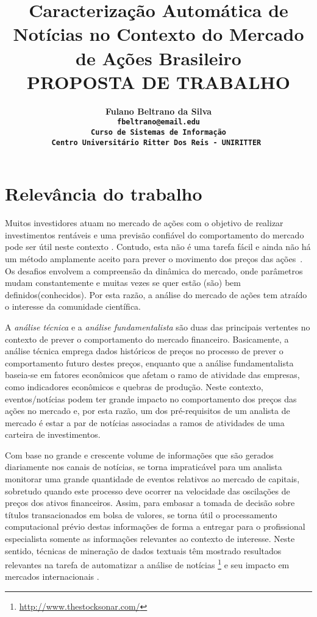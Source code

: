 \documentclass[11pt,a4paper]{article}
\begin{document}
\title{Caracterização Automática de Notícias no Contexto do Mercado de Ações Brasileiro\\ \smallskip
\small{ PROPOSTA DE TRABALHO}}

\author{ \bf Fulano Beltrano da Silva\\
		\tt fbeltrano@email.edu \\
		Curso de Sistemas de Informação \\
		Centro Universitário Ritter Dos Reis - UNIRITTER 
}

\maketitle
\thispagestyle{empty}




\section{Relevância do trabalho} \label{sec:intro}

Muitos investidores atuam no mercado de ações com o objetivo de realizar investimentos rentáveis e uma previsão confiável do comportamento do mercado pode ser útil neste contexto \cite{twitter:stock}. Contudo, esta não é uma tarefa fácil e ainda não há um método amplamente aceito para prever o movimento dos preços das ações~\cite{Schumaker:2010}. Os desafios envolvem a compreensão da dinâmica do mercado, onde parâmetros mudam constantemente e muitas vezes se quer estão (são) bem definidos(conhecidos). Por esta razão, a análise do mercado de ações tem atraído o interesse da comunidade científica.

A \textit{análise técnica} e a \textit{análise fundamentalista} \cite{deschatre2006aprenda} são duas das principais vertentes no contexto de prever o comportamento do mercado financeiro. Basicamente, a análise técnica emprega dados históricos de preços no processo de prever o comportamento futuro destes preços, enquanto que a análise fundamentalista baseia-se em fatores econômicos que afetam o ramo de atividade das empresas, como indicadores econômicos e quebras de produção. Neste contexto, eventos/notícias podem ter grande impacto no comportamento dos preços das ações no mercado e, por esta razão, um dos pré-requisitos de um analista de mercado é estar a par de notícias associadas a ramos de atividades de uma carteira de investimentos.

Com base no grande e crescente volume de informações que são gerados diariamente nos canais de notícias, se torna impraticável para um analista monitorar uma grande quantidade de eventos relativos ao mercado de capitais, sobretudo quando este processo deve ocorrer na velocidade das oscilações de preços dos ativos financeiros. Assim, para embasar a tomada de decisão sobre títulos transacionados em bolsa de valores, se torna útil o processamento computacional prévio destas informações de forma a entregar para o profissional especialista somente as informações relevantes ao contexto de interesse. Neste sentido, técnicas de mineração de dados textuais têm mostrado resultados relevantes na tarefa de automatizar a análise de notícias \footnote{\url{http://www.thestocksonar.com/}} e seu impacto em mercados internacionais \cite{Schumaker:2010,Mahajan:2008}.
\end{document}

